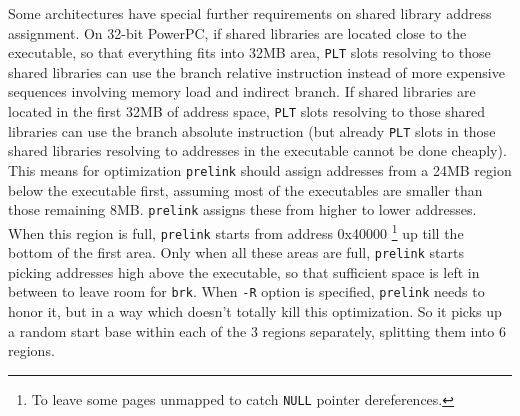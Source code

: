 \documentclass[twoside]{article}
\def\tts#1{\texttt{\small #1}}
\begin{document}
Some architectures have special further requirements on shared library
address assignment.  On 32-bit PowerPC, if shared libraries are located
close to the executable, so that everything fits into 32MB area, \tts{PLT}
slots resolving to those shared libraries can use the branch relative
instruction instead of more expensive sequences involving memory load
and indirect branch.  If shared libraries are located in the
first 32MB of address space, \tts{PLT} slots resolving to those shared
libraries can use the branch absolute instruction (but already \tts{PLT}
slots in those shared libraries resolving to addresses in the executable
cannot be done cheaply).  This means for optimization \tts{prelink}
should assign addresses from a 24MB region below the executable first, assuming
most of the executables are smaller than those remaining 8MB.
\tts{prelink} assigns these from higher to lower addresses.  When this
region is full, \tts{prelink} starts from address 0x40000
\footnote{To leave some pages unmapped to catch \tts{NULL} pointer
dereferences.} up till the bottom of the first area.  Only when
all these areas are full, \tts{prelink} starts picking addresses high above
the executable, so that sufficient space is left in between to leave room
for \tts{brk}.
When \tts{-R} option is specified, \tts{prelink} needs to honor it, but
in a way which doesn't totally kill this optimization.  So it picks up
a random start base within each of the 3 regions separately, splitting
them into 6 regions.
\end{document}
